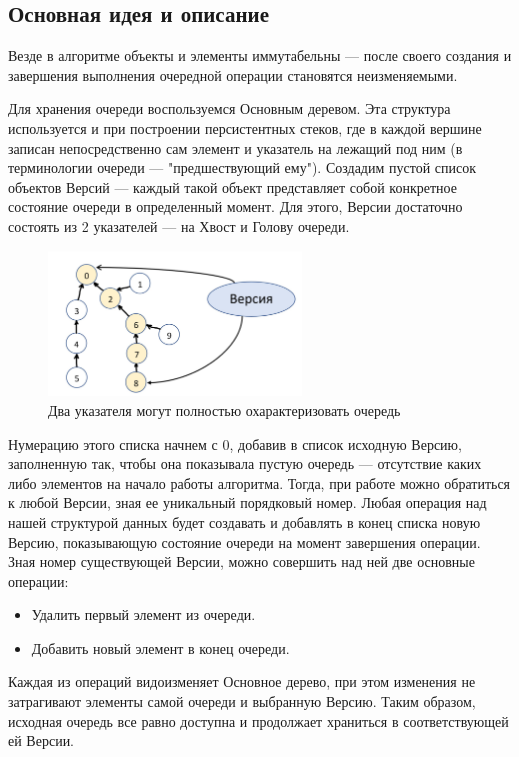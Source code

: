\documentclass[a4paper,12pt]{extarticle}
\begin{document}
\subsection{Основная идея и описание}
Везде в алгоритме объекты и элементы иммутабельны — после своего создания и завершения выполнения очередной операции становятся неизменяемыми.\par
Для хранения очереди воспользуемся Основным деревом. Эта структура используется и при построении персистентных стеков, где в каждой вершине записан непосредственно сам элемент и указатель на лежащий под ним (в терминологии очереди — "предшествующий ему"). Создадим пустой список объектов Версий — каждый такой объект представляет собой конкретное состояние очереди в определенный момент. Для этого, Версии достаточно состоять из 2 указателей — на Хвост и Голову очереди.\\
\begin{figure}[h!]
	\centering
	\includegraphics[width=0.6\textwidth]{content/1_img.jpg}
	\caption{Два указателя могут полностью охарактеризовать очередь}
	\label{version}
\end{figure}\par
Нумерацию этого списка начнем с 0, добавив в список исходную Версию, заполненную так, чтобы она показывала пустую очередь — отсутствие каких либо элементов на начало работы алгоритма. Тогда, при работе можно обратиться к любой Версии, зная ее уникальный порядковый номер. Любая операция над нашей структурой данных будет создавать и добавлять в конец списка новую Версию, показывающую состояние очереди на момент завершения операции.\\
Зная номер существующей Версии, можно совершить над ней две основные операции:
\begin{itemize}
    \item Удалить первый элемент из очереди.
    \item Добавить новый элемент в конец очереди.
\end{itemize}\par
Каждая из операций видоизменяет Основное дерево, при этом изменения не затрагивают элементы самой очереди и выбранную Версию. Таким образом, исходная очередь все равно доступна и продолжает храниться в соответствующей ей Версии.\par
\end{document}
